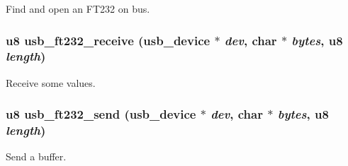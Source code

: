 Find and open an FT232 on bus. 
\subsubsection{\setlength{\rightskip}{0pt plus 5cm}u8 usb\_\-ft232\_\-receive ({\bf usb\_\-device} $\ast$ {\em dev}, char $\ast$ {\em bytes}, u8 {\em length})}\label{ft232_8c_0cf7d193c90d165c74634239e8c9ecd4}


Receive some values. 
\subsubsection{\setlength{\rightskip}{0pt plus 5cm}u8 usb\_\-ft232\_\-send ({\bf usb\_\-device} $\ast$ {\em dev}, char $\ast$ {\em bytes}, u8 {\em length})}\label{ft232_8c_15b0b076a221679eb2360844e5a940e4}


Send a buffer. 
